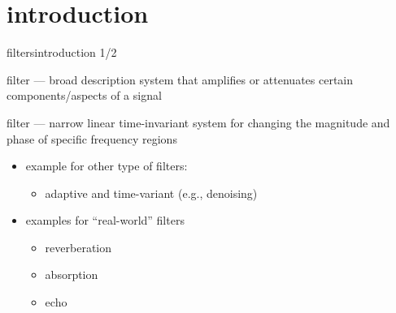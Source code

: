 



\subtitle{Part 15: Digital Filters I}


	

\section[intro]{introduction}
	\begin{frame}{filters}{introduction 1/2}
        \begin{block}{filter --- broad description}
            system that amplifies or attenuates certain components/aspects of a signal
        \end{block}
        \pause
        \bigskip
        \begin{block}{filter --- narrow}
            linear time-invariant system for changing the magnitude and phase of specific frequency regions            
        \end{block}
        \pause
        \bigskip
        \begin{itemize}
            \item   example for other type of filters:
                \begin{itemize}
                    \item	adaptive  and time-variant (e.g., denoising)
                \end{itemize}
            \item	examples for ``real-world'' filters
                \begin{itemize}
                    \item	reverberation
                    \item	absorption
                    \item	echo
                \end{itemize}
        \end{itemize}
	\end{frame}
